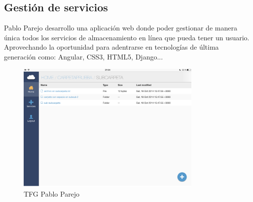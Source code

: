 \subsection{Gestión de servicios}
Pablo Parejo desarrollo una aplicación web donde poder gestionar de manera única todos los servicios de almacenamiento en línea que pueda tener un usuario. Aprovechando la oportunidad para adentrarse en tecnologías de última generación como: Angular, CSS3, HTML5, Django...
\begin{figure}[H]
    \centering
    \includegraphics[width=90mm]{memoria/LaTeX/img/introduccion/parejo.png}
    \caption{TFG Pablo Parejo}
\end{figure}














































































































